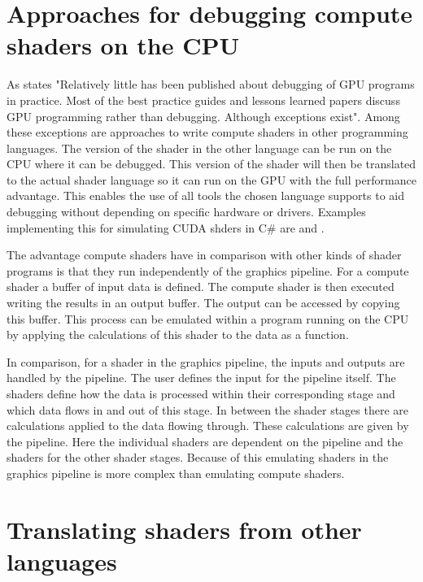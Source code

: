 \section{Approaches for debugging compute shaders on the CPU}
\label{section:computeApproaches}

As  states "Relatively little has been published about debugging of GPU programs  in  practice.  Most  of  the  best  practice  guides  and lessons learned papers discuss GPU programming rather than debugging. Although exceptions exist". Among these exceptions are approaches to write compute shaders in other programming languages. The version of the shader in the other language can be run on the CPU where it can be debugged. This version of the shader will then be translated to the actual shader language so it can run on the GPU with the full performance advantage. This enables the use of all tools the chosen language supports to aid debugging without depending on specific hardware or drivers.
Examples implementing this for simulating CUDA shders in C\# are  and .

The advantage compute shaders have in comparison with other kinds of shader programs is that they run independently of the graphics pipeline. For a compute shader a buffer of input data is defined. The compute shader is then executed writing the results in an output buffer. The output can be accessed by copying this buffer. This process can be emulated within a program running on the CPU by applying the calculations of this shader to the data as a function.

In comparison, for a shader in the graphics pipeline, the inputs and outputs are handled by the pipeline. The user defines the input for the pipeline itself. The shaders define how the data is processed within their corresponding stage and which data flows in and out of this stage. In between the shader stages there are calculations applied to the data flowing through. These calculations are given by the pipeline. Here the individual shaders are dependent on the pipeline and the shaders for the other shader stages. Because of this emulating shaders in the graphics pipeline is more complex than emulating compute shaders.

\newpage

\section{Translating shaders from other languages}\label{section:translating}

